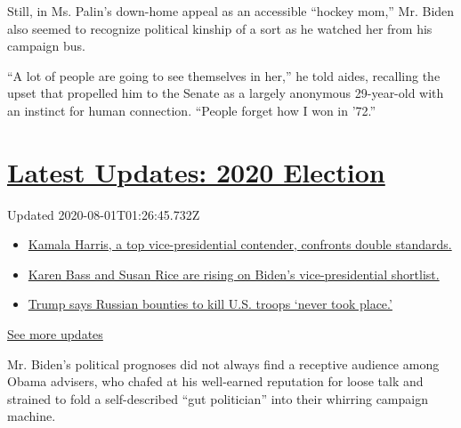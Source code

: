 Still, in Ms. Palin's down-home appeal as an accessible ``hockey mom,''
Mr. Biden also seemed to recognize political kinship of a sort as he
watched her from his campaign bus.

``A lot of people are going to see themselves in her,'' he told aides,
recalling the upset that propelled him to the Senate as a largely
anonymous 29-year-old with an instinct for human connection. ``People
forget how I won in '72.''

\hypertarget{latest-updates-2020-election}{%
\section{\texorpdfstring{\href{https://www.nytimes.com/2020/07/31/us/elections/biden-vs-trump.html?action=click\&pgtype=Article\&state=default\&region=MAIN_CONTENT_1\&context=storylines_live_updates}{Latest
Updates: 2020
Election}}{Latest Updates: 2020 Election}}\label{latest-updates-2020-election}}

Updated 2020-08-01T01:26:45.732Z

\begin{itemize}
\tightlist
\item
  \href{https://www.nytimes.com/2020/07/31/us/elections/biden-vs-trump.html?action=click\&pgtype=Article\&state=default\&region=MAIN_CONTENT_1\&context=storylines_live_updates\#link-29fdff45}{Kamala
  Harris, a top vice-presidential contender, confronts double
  standards.}
\item
  \href{https://www.nytimes.com/2020/07/31/us/elections/biden-vs-trump.html?action=click\&pgtype=Article\&state=default\&region=MAIN_CONTENT_1\&context=storylines_live_updates\#link-13ec3d9c}{Karen
  Bass and Susan Rice are rising on Biden's vice-presidential
  shortlist.}
\item
  \href{https://www.nytimes.com/2020/07/31/us/elections/biden-vs-trump.html?action=click\&pgtype=Article\&state=default\&region=MAIN_CONTENT_1\&context=storylines_live_updates\#link-49e9a016}{Trump
  says Russian bounties to kill U.S. troops `never took place.'}
\end{itemize}

\href{https://www.nytimes.com/2020/07/31/us/elections/biden-vs-trump.html?action=click\&pgtype=Article\&state=default\&region=MAIN_CONTENT_1\&context=storylines_live_updates}{See
more updates}

Mr. Biden's political prognoses did not always find a receptive audience
among Obama advisers, who chafed at his well-earned reputation for loose
talk and strained to fold a self-described ``gut politician'' into their
whirring campaign machine.

